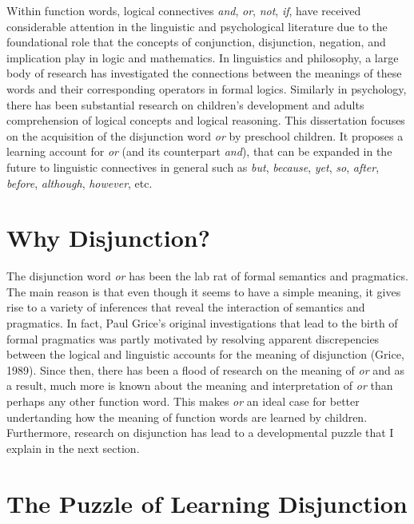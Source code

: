 \documentclass[oneside]{report}
\theoremstyle{definition}
\theoremstyle{definition}
\theoremstyle{definition}
\theoremstyle{remark}
\begin{document}
Within function words, logical connectives \emph{and}, \emph{or},
\emph{not}, \emph{if}, have received considerable attention in the
linguistic and psychological literature due to the foundational role
that the concepts of conjunction, disjunction, negation, and implication
play in logic and mathematics. In linguistics and philosophy, a large
body of research has investigated the connections between the meanings
of these words and their corresponding operators in formal logics.
Similarly in psychology, there has been substantial research on
children's development and adults comprehension of logical concepts and
logical reasoning. This dissertation focuses on the acquisition of the
disjunction word \emph{or} by preschool children. It proposes a learning
account for \emph{or} (and its counterpart \emph{and}), that can be
expanded in the future to linguistic connectives in general such as
\emph{but}, \emph{because}, \emph{yet}, \emph{so}, \emph{after},
\emph{before}, \emph{although}, \emph{however}, etc.

\section{Why Disjunction?}\label{why-disjunction}

The disjunction word \emph{or} has been the lab rat of formal semantics
and pragmatics. The main reason is that even though it seems to have a
simple meaning, it gives rise to a variety of inferences that reveal the
interaction of semantics and pragmatics. In fact, Paul Grice's original
investigations that lead to the birth of formal pragmatics was partly
motivated by resolving apparent discrepencies between the logical and
linguistic accounts for the meaning of disjunction (Grice, 1989). Since
then, there has been a flood of research on the meaning of \emph{or} and
as a result, much more is known about the meaning and interpretation of
\emph{or} than perhaps any other function word. This makes \emph{or} an
ideal case for better undertanding how the meaning of function words are
learned by children. Furthermore, research on disjunction has lead to a
developmental puzzle that I explain in the next section.

\section{The Puzzle of Learning
Disjunction}\label{the-puzzle-of-learning-disjunction}
\end{document}
